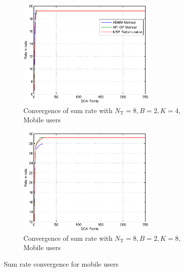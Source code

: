 \documentclass[a4paper, 12pt,titlepage]{dithesis} %
\begin{document}
\begin{figure}
	\centering
	\begin{subfigure}[b]{0.75\textwidth}
		\centering
		\includegraphics[width=0.75\textwidth]{plot8142}
		\caption{Convergence of sum rate with $N_\mathrm{T} = 8, B = 2, K = 4$, Mobile users}
		\label{fig_1}
	\end{subfigure}
	\begin{subfigure}[b]{0.75\textwidth}
		\centering
		\includegraphics[width=0.75\textwidth]{plot8182}
		\caption{Convergence of sum rate with $N_\mathrm{T} = 8, B = 2, K = 8$, Mobile users}
		\label{fig-2}
	\end{subfigure}
	\caption{Sum rate convergence for mobile users}
	\label{figII}
\end{figure}
\end{document}

